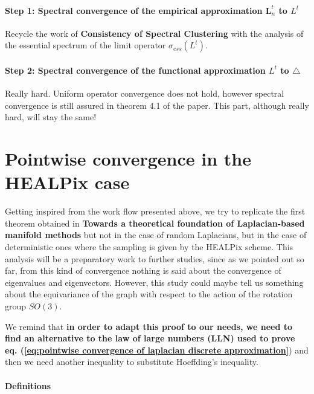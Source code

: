 \paragraph{Step 1: Spectral convergence of the empirical approximation $\mathbf{ L}_n^t$ to $L^t$}
Recycle the work of \textbf{Consistency of Spectral Clustering} with the analysis of the essential spectrum of the limit operator $\sigma_{ess}(L^t)$.
\paragraph{Step 2: Spectral convergence of the functional approximation $L^t$ to $\triangle$}
Really hard. Uniform operator convergence does not hold, however spectral convergence is still assured in theorem 4.1 of the paper. This part, although really hard, will stay the same!


\section{Pointwise convergence in the HEALPix case}

Getting inspired from the work flow presented above, we try to replicate the first theorem obtained in \textbf{Towards a theoretical foundation of Laplacian-based manifold methods} but not in the case of random Laplacians, but in the case of deterministic ones where the sampling is given by the HEALPix scheme. This analysis will be a preparatory work to further studies, since as we pointed out so far, from this kind of convergence nothing is said about the convergence of eigenvalues and eigenvectors. However, this study could maybe tell us something about the equivariance of the graph with respect to the action of the rotation group $SO(3)$.


We remind that \textbf{in order to adapt this proof to our needs, we need to find an alternative to the law of large numbers (LLN) used to prove eq. (\ref{eq:pointwise convergence of laplacian discrete approximation}}) and then we need another inequality to substitute Hoeffding's inequality. 


\paragraph{Definitions}

